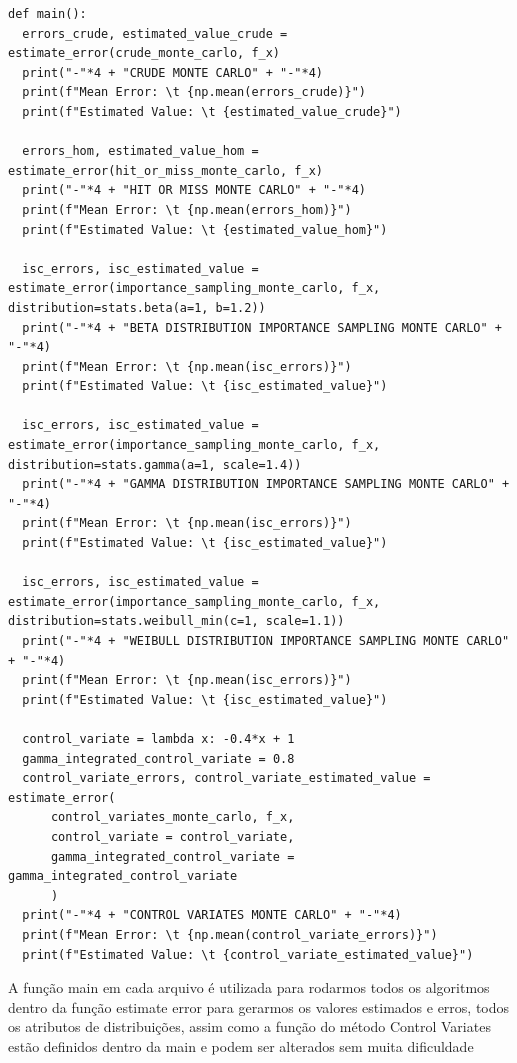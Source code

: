 \documentclass[twocolumn,amsmath,amssymb,floatfix]{revtex4}
\begin{document}
\begin{lstlisting}
def main():
  errors_crude, estimated_value_crude = estimate_error(crude_monte_carlo, f_x)
  print("-"*4 + "CRUDE MONTE CARLO" + "-"*4)
  print(f"Mean Error: \t {np.mean(errors_crude)}")
  print(f"Estimated Value: \t {estimated_value_crude}")

  errors_hom, estimated_value_hom = estimate_error(hit_or_miss_monte_carlo, f_x)
  print("-"*4 + "HIT OR MISS MONTE CARLO" + "-"*4)
  print(f"Mean Error: \t {np.mean(errors_hom)}")
  print(f"Estimated Value: \t {estimated_value_hom}")

  isc_errors, isc_estimated_value = estimate_error(importance_sampling_monte_carlo, f_x, distribution=stats.beta(a=1, b=1.2))
  print("-"*4 + "BETA DISTRIBUTION IMPORTANCE SAMPLING MONTE CARLO" + "-"*4)
  print(f"Mean Error: \t {np.mean(isc_errors)}")
  print(f"Estimated Value: \t {isc_estimated_value}")

  isc_errors, isc_estimated_value = estimate_error(importance_sampling_monte_carlo, f_x, distribution=stats.gamma(a=1, scale=1.4))
  print("-"*4 + "GAMMA DISTRIBUTION IMPORTANCE SAMPLING MONTE CARLO" + "-"*4)
  print(f"Mean Error: \t {np.mean(isc_errors)}")
  print(f"Estimated Value: \t {isc_estimated_value}")

  isc_errors, isc_estimated_value = estimate_error(importance_sampling_monte_carlo, f_x, distribution=stats.weibull_min(c=1, scale=1.1))
  print("-"*4 + "WEIBULL DISTRIBUTION IMPORTANCE SAMPLING MONTE CARLO" + "-"*4)
  print(f"Mean Error: \t {np.mean(isc_errors)}")
  print(f"Estimated Value: \t {isc_estimated_value}")
  
  control_variate = lambda x: -0.4*x + 1
  gamma_integrated_control_variate = 0.8
  control_variate_errors, control_variate_estimated_value = estimate_error(
      control_variates_monte_carlo, f_x, 
      control_variate = control_variate,
      gamma_integrated_control_variate = gamma_integrated_control_variate
      )
  print("-"*4 + "CONTROL VARIATES MONTE CARLO" + "-"*4)
  print(f"Mean Error: \t {np.mean(control_variate_errors)}")
  print(f"Estimated Value: \t {control_variate_estimated_value}")
\end{lstlisting}
\indent A função main em cada arquivo é utilizada para rodarmos todos os algoritmos dentro da função estimate error para gerarmos os valores estimados e erros, todos os atributos de distribuições, assim como a função do método Control Variates estão definidos dentro da main e podem ser alterados sem muita dificuldade \\
\end{document}
